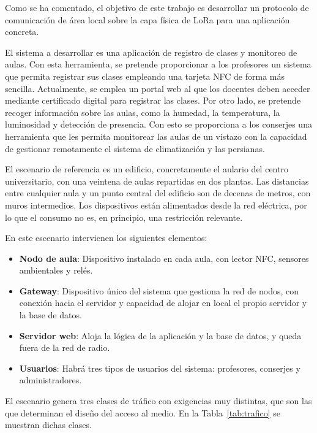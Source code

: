 Como se ha comentado, el objetivo de este trabajo es desarrollar un protocolo de comunicación de área local sobre la capa física de LoRa para una aplicación concreta.

El sistema a desarrollar es una aplicación de registro de clases y monitoreo de aulas. Con esta herramienta, se pretende proporcionar a los profesores un sistema que permita registrar sus clases empleando una tarjeta NFC de forma más sencilla. Actualmente, se emplea un portal web al que los docentes deben acceder mediante certificado digital para registrar las clases. Por otro lado, se pretende recoger información sobre las aulas, como la humedad, la temperatura, la luminosidad y detección de presencia. Con esto se proporciona a los conserjes una herramienta que les permita monitorear las aulas de un vistazo con la capacidad de gestionar remotamente el sistema de climatización y las persianas. 

El escenario de referencia es un edificio, concretamente el aulario del centro universitario, con una veintena de aulas repartidas en dos plantas. Las distancias entre cualquier aula y un punto central del edificio son de decenas de metros, con muros intermedios. Los dispositivos están alimentados desde la red eléctrica, por lo que el consumo no es, en principio, una restricción relevante.

En este escenario intervienen los siguientes elementos:

\begin{itemize}
\item \textbf{Nodo de aula}: Dispositivo instalado en cada aula, con lector NFC, sensores ambientales y relés.
\item \textbf{Gateway}: Dispositivo único del sistema que gestiona la red de nodos, con conexión hacia el servidor y capacidad de alojar en local el propio servidor y la base de datos.
\item \textbf{Servidor web}: Aloja la lógica de la aplicación y la base de datos, y queda fuera de la red de radio.
\item \textbf{Usuarios}: Habrá tres tipos de usuarios del sistema: profesores, conserjes y administradores.
\end{itemize}

El escenario genera tres clases de tráfico con exigencias muy distintas, que son las que determinan el diseño del acceso al medio. En la Tabla~\ref{tab:trafico} se muestran dichas clases.

